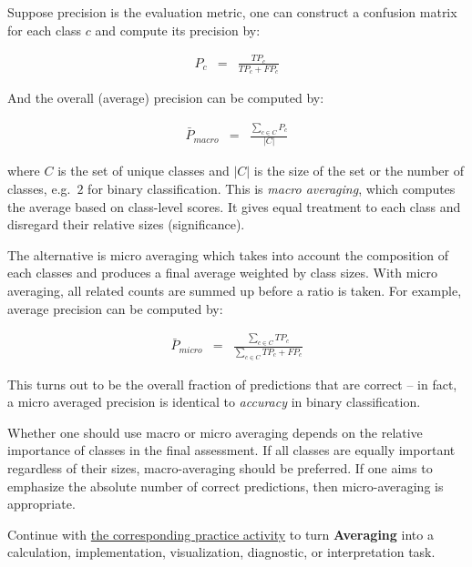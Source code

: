 \documentclass[
  letterpaper,
]{scrbook}
\begin{document}
Suppose precision is the evaluation metric, one can construct a
confusion matrix for each class \(c\) and compute its precision by:

\[\begin{aligned}
  P_c & = & \frac{TP_c}{TP_c + FP_c}
\end{aligned}\]

And the overall (average) precision can be computed by:

\[\begin{aligned}
  \bar{P}_{macro} & = & \frac{\sum_{c \in C} P_c}{|C|}
\end{aligned}\]

where \(C\) is the set of unique classes and \(|C|\) is the size of the
set or the number of classes, e.g.~\(2\) for binary classification. This
is \emph{macro averaging}, which computes the average based on
class-level scores. It gives equal treatment to each class and disregard
their relative sizes (significance).

The alternative is micro averaging which takes into account the
composition of each classes and produces a final average weighted by
class sizes. With micro averaging, all related counts are summed up
before a ratio is taken. For example, average precision can be computed
by:

\[\begin{aligned}
  \bar{P}_{micro} & = & \frac{\sum_{c \in C} TP_c}{\sum_{c \in C} TP_c + FP_c}
\end{aligned}\]

This turns out to be the overall fraction of predictions that are
correct -- in fact, a micro averaged precision is identical to
\emph{accuracy} in binary classification.

Whether one should use macro or micro averaging depends on the relative
importance of classes in the final assessment. If all classes are
equally important regardless of their sizes, macro-averaging should be
preferred. If one aims to emphasize the absolute number of correct
predictions, then micro-averaging is appropriate.

\begin{tcolorbox}[enhanced jigsaw, arc=.35mm, bottomrule=.15mm, bottomtitle=1mm, breakable, colback=white, colbacktitle=quarto-callout-tip-color!10!white, colframe=quarto-callout-tip-color-frame, coltitle=black, left=2mm, leftrule=.75mm, opacityback=0, opacitybacktitle=0.6, rightrule=.15mm, title=\textcolor{quarto-callout-tip-color}{\faLightbulb}\hspace{0.5em}{Put it into practice}, titlerule=0mm, toprule=.15mm, toptitle=1mm]

Continue with \hyperref[sec-pr-14-averaging]{the corresponding practice
activity} to turn \textbf{Averaging} into a calculation, implementation,
visualization, diagnostic, or interpretation task.

\end{tcolorbox}
\end{document}
